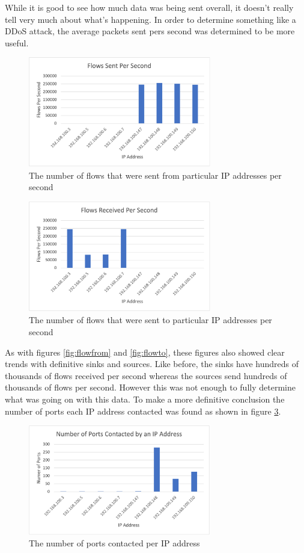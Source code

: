 \documentclass[conference]{IEEEtran}
\begin{document}
While it is good to see how much data was being sent overall, it doesn't really tell very much about what's happening.
In order to determine something like a DDoS attack, the average packets sent pers second was determined to be more useful.

\begin{figure}[htbp]
    \includegraphics[width=8cm]{Figure3.png}
    \centering
    \caption{The number of flows that were sent from particular IP addresses per second}
    \label{fig:sentfrompersec}
\end{figure}

\begin{figure}[htbp]
    \includegraphics[width=8cm]{Figure4.png}
    \centering
    \caption{The number of flows that were sent to particular IP addresses per second}
    \label{fig:senttopersec}
\end{figure}

As with figures \ref{fig:flowfrom} and \ref{fig:flowto}, these figures also showed clear trends with definitive
sinks and sources. Like before, the sinks have hundreds of thousands of flows received per second whereas the sources
send hundreds of thousands of flows per second. However this was not enough to fully determine what was going on with
this data. To make a more definitive conclusion the number of ports each IP address contacted was found as shown in 
figure \ref{fig:portscontacted}. 

\begin{figure}[htbp]
    \includegraphics[width=8cm]{Figure5.png}
    \centering
    \caption{The number of ports contacted per IP address}
    \label{fig:portscontacted}
\end{figure}
\end{document}

